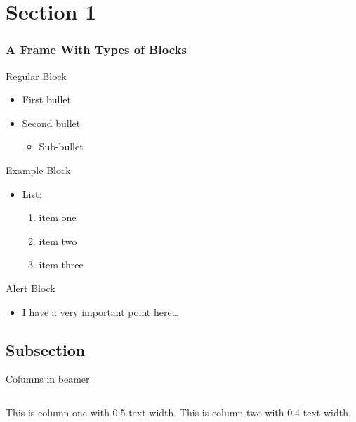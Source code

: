 \documentclass[aspectratio=1610]{beamer}
\begin{document}
\section{Section 1}
\begin{frame}
  \frametitle{A Frame With Types of Blocks}
  \begin{block}{Regular Block}
  \begin{itemize}
  \item First bullet
  \item Second bullet
    \begin{itemize}
    \item Sub-bullet
    \end{itemize}
  \end{itemize}
  \end{block}
  \begin{exampleblock}{Example Block}
  \begin{itemize}
  \item List:
    \begin{enumerate}
    \item item one
    \item item two
    \item item three
    \end{enumerate}
  \end{itemize}
  \end{exampleblock}
  \begin{alertblock}{Alert Block}
    \begin{itemize}
    \item I have a very important point here\ldots
    \end{itemize}
  \end{alertblock}
\end{frame}



\subsection{Subsection}
\begin{frame}{Columns in beamer}
    \begin{columns}
        \centering
        This is column one with 0.5 text width.
        \centering
        This is column two with 0.4 text width.
    \end{columns}
\end{frame}
\end{document}
